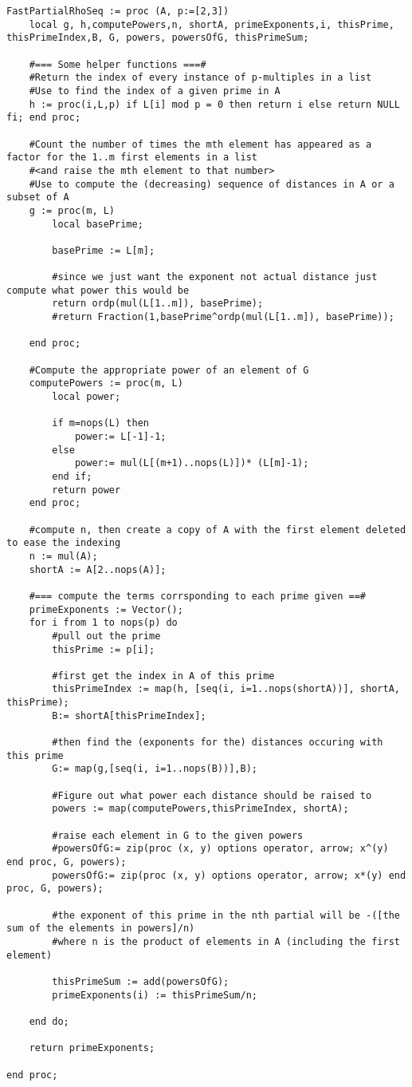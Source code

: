 \newpage
\begin{lstlisting}
FastPartialRhoSeq := proc (A, p:=[2,3]) 
	local g, h,computePowers,n, shortA, primeExponents,i, thisPrime, thisPrimeIndex,B, G, powers, powersOfG, thisPrimeSum;
	
	#=== Some helper functions ===#
	#Return the index of every instance of p-multiples in a list 
	#Use to find the index of a given prime in A
	h := proc(i,L,p) if L[i] mod p = 0 then return i else return NULL fi; end proc;	

	#Count the number of times the mth element has appeared as a factor for the 1..m first elements in a list
	#<and raise the mth element to that number>
	#Use to compute the (decreasing) sequence of distances in A or a subset of A
	g := proc(m, L)
		local basePrime;
		
		basePrime := L[m];
		
		#since we just want the exponent not actual distance just compute what power this would be
		return ordp(mul(L[1..m]), basePrime); 
		#return Fraction(1,basePrime^ordp(mul(L[1..m]), basePrime));

	end proc;
	
	#Compute the appropriate power of an element of G
	computePowers := proc(m, L)
		local power;
	
		if m=nops(L) then
			power:= L[-1]-1;
		else 
			power:= mul(L[(m+1)..nops(L)])* (L[m]-1);
		end if;
		return power
	end proc;
	
	#compute n, then create a copy of A with the first element deleted to ease the indexing
	n := mul(A);
	shortA := A[2..nops(A)];

	#=== compute the terms corrsponding to each prime given ==#
	primeExponents := Vector();
	for i from 1 to nops(p) do
		#pull out the prime 
		thisPrime := p[i];

		#first get the index in A of this prime
		thisPrimeIndex := map(h, [seq(i, i=1..nops(shortA))], shortA, thisPrime);
		B:= shortA[thisPrimeIndex];

		#then find the (exponents for the) distances occuring with this prime
		G:= map(g,[seq(i, i=1..nops(B))],B);
	
		#Figure out what power each distance should be raised to
		powers := map(computePowers,thisPrimeIndex, shortA);
	
		#raise each element in G to the given powers
   		#powersOfG:= zip(proc (x, y) options operator, arrow; x^(y) end proc, G, powers); 
		powersOfG:= zip(proc (x, y) options operator, arrow; x*(y) end proc, G, powers); 
		
		#the exponent of this prime in the nth partial will be -([the sum of the elements in powers]/n)
		#where n is the product of elements in A (including the first element)

		thisPrimeSum := add(powersOfG);
		primeExponents(i) := thisPrimeSum/n; 
		
 	end do;

	return primeExponents;
	
end proc;
\end{lstlisting}